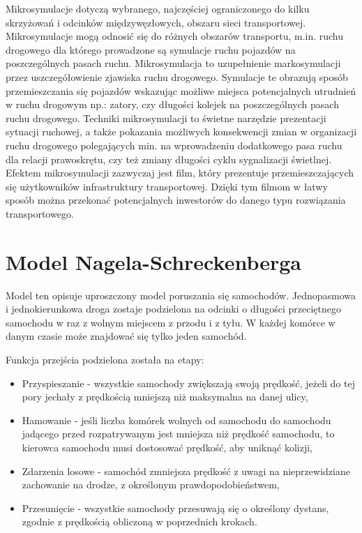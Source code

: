 \documentclass{sprawozdanie-agh}
\begin{document}
		Mikrosymulacje dotyczą wybranego, najczęściej ograniczonego do kilku skrzyżowań i odcinków międzywęzłowych, obszaru sieci transportowej. Mikrosymulacje mogą odnosić się do różnych obszarów transportu, m.in. ruchu drogowego dla którego prowadzone są symulacje ruchu pojazdów na poszczególnych pasach ruchu. Mikrosymulacja to uzupełnienie markosymulacji przez uszczegółowienie zjawiska ruchu drogowego. Symulacje te obrazują sposób przemieszczania się pojazdów wskazując możliwe miejsca potencjalnych utrudnień w ruchu drogowym np.: zatory, czy długości kolejek na poszczególnych pasach ruchu drogowego.
		Techniki mikrosymulacji to świetne narzędzie prezentacji sytuacji ruchowej, a także pokazania możliwych konsekwencji zmian w organizacji ruchu drogowego polegających min. na wprowadzeniu dodatkowego pasa ruchu dla relacji prawoskrętu, czy też zmiany długości cyklu sygnalizacji świetlnej. Efektem mikrosymulacji zazwyczaj jest film, który prezentuje przemieszczających się użytkowników infrastruktury transportowej. Dzięki tym filmom w łatwy sposób można przekonać potencjalnych inwestorów do danego typu rozwiązania transportowego.



		\section{Model Nagela-Schreckenberga}

		Model ten opisuje uproszczony model poruszania się samochodów. Jednopasmowa i jednokierunkowa droga zostaje podzielona na odcinki o długości przeciętnego samochodu w raz z wolnym miejscem z przodu i z tyłu. W każdej komórce w danym czasie może znajdować się tylko jeden samochód.

		Funkcja przejścia podzielona została na etapy:

		\begin{itemize}
			\item Przyspieszanie - wszystkie samochody zwiększają swoją prędkość, jeżeli do tej pory jechały z prędkością mniejszą niż maksymalna na danej ulicy,
			\item Hamowanie - jeśli liczba komórek wolnych od samochodu do samochodu jadącego przed rozpatrywanym jest mniejsza niż prędkość samochodu, to kierowca samochodu musi dostosować prędkość, aby uniknąć kolizji,
			\item Zdarzenia losowe - samochód zmniejsza prędkość z uwagi na nieprzewidziane zachowanie na drodze, z określonym prawdopodobieństwem,
			\item Przesunięcie - wszystkie samochody przesuwają się o określony dystans, zgodnie z prędkością obliczoną w poprzednich krokach.
		\end{itemize}
\end{document}
